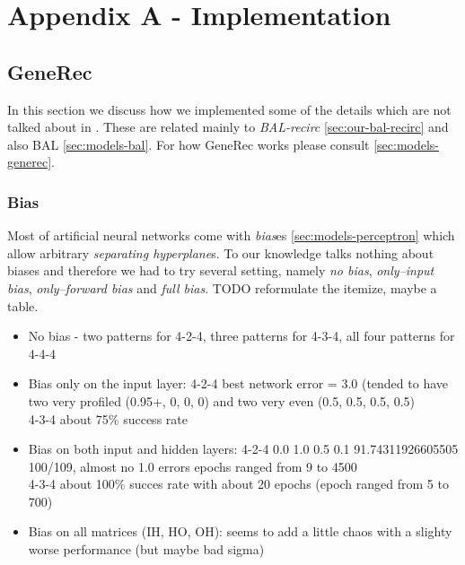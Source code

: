 
\section*{Appendix A - Implementation}
\appendix
{}
\label{sec:appendix-impl} 


\subsection*{GeneRec} 
\label{sec:appendix-impl-generec} 

In this section we discuss how we implemented some of the details which are not talked about in \citet{o1996bio}. These are related mainly to \emph{BAL-recirc} \ref{sec:our-bal-recirc} and also BAL \ref{sec:models-bal}. For how GeneRec works please consult \ref{sec:models-generec}.  

\subsubsection*{Bias} 

Most of artificial neural networks come with \emph{bias}es \ref{sec:models-perceptron} which allow arbitrary \emph{separating hyperplane}s. To our knowledge \citet{o1996bio} talks nothing about biases and therefore we had to try several setting, namely \emph{no bias}, \emph{only--input bias}, \emph{only--forward bias} and \emph{full bias}. TODO reformulate the itemize, maybe a table. 

\begin{itemize} 
\item No bias - two patterns for 4-2-4, three patterns for 4-3-4, all four patterns for 4-4-4
\item Bias only on the input layer:  
4-2-4 best network error = 3.0 (tended to have two very profiled (0.95+, 0, 0, 0) and two very even (0.5, 0.5, 0.5, 0.5)  \\
4-3-4 about 75\% success rate 
\item Bias on both input and hidden layers: 
    4-2-4 0.0 1.0 0.5 0.1 91.74311926605505 100/109, almost no 1.0 errors 
          epochs ranged from 9 to 4500 \\ 
    4-3-4 about 100\% succes rate with about 20 epochs (epoch ranged from 5 to 700) 
\item Bias on all matrices (IH, HO, OH): 
    seems to add a little chaos with a slighty worse performance (but maybe bad sigma)

\end{itemize} 


